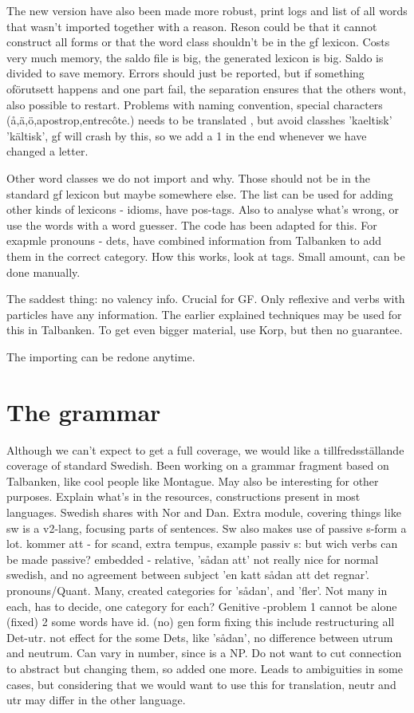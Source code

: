 \documentclass{report}
\begin{document}
The new version have also been made more robust, print logs and list of all
words that wasn't imported together with a reason. Reson could be that it
cannot construct all forms or that the word class shouldn't be in the gf lexicon.
Costs very much memory, the saldo file is big, the generated lexicon is big.
Saldo is divided to save memory. Errors should just be reported, but if something oförutsett
happens and one part fail, the separation ensures that the others wont, also
possible to restart. Problems with naming convention, special
characters (å,ä,ö,apostrop,entrecôte.) needs to be translated , but avoid
classhes 'kaeltisk' 'kältisk', gf will crash by this, so we add a 1
in the end whenever we have changed a letter.

Other word classes we do not import and why.
Those should not be in the standard gf lexicon but maybe somewhere else.
The list can be used for adding other kinds of lexicons - idioms, have pos-tags.
Also to analyse what's wrong, or use the words with a word guesser. The code
has been adapted for this.
For exapmle pronouns - dets, have combined information from Talbanken to add them in the correct
category. How this works, look at tags. Small amount, can be done manually.

The saddest thing: no valency info. Crucial for GF. Only reflexive and verbs with particles
have any information. The earlier explained techniques may be used for this in Talbanken.
To get even bigger material, use Korp, but then no guarantee.

The importing can be redone anytime.

\section{The grammar}
Although we can't expect to get a full coverage, we would like a tillfredsställande
coverage of standard Swedish. Been working on a grammar fragment based on Talbanken,
like cool people like Montague. May also be interesting for other purposes.
Explain what's in the resources, constructions present in most languages. 
Swedish shares with Nor and Dan. Extra module, covering things like sw is a
v2-lang, focusing parts of sentences. Sw also makes use of passive s-form a lot.
kommer att - for scand, extra tempus, example
passiv s: but wich verbs can be made passive? 
embedded - relative, 'sådan att' not really nice for normal swedish, and no agreement
between subject 'en katt sådan att det regnar'.
pronouns/Quant. Many, created categories for 'sådan', and 'fler'. Not many in each,
has to decide, one category for each?
Genitive -problem 1 cannot be alone (fixed) 2 some words have id. (no) gen form
           fixing this include restructuring all
Det-utr. not effect for the some Dets, like 'sådan', no difference between utrum and neutrum.
 Can vary in number, since is a NP. Do not want to cut connection to abstract but changing them,
 so added one more. Leads to ambiguities in some cases, but considering that we would want to use
 this for translation, neutr and utr may differ in the other language.
\end{document}
